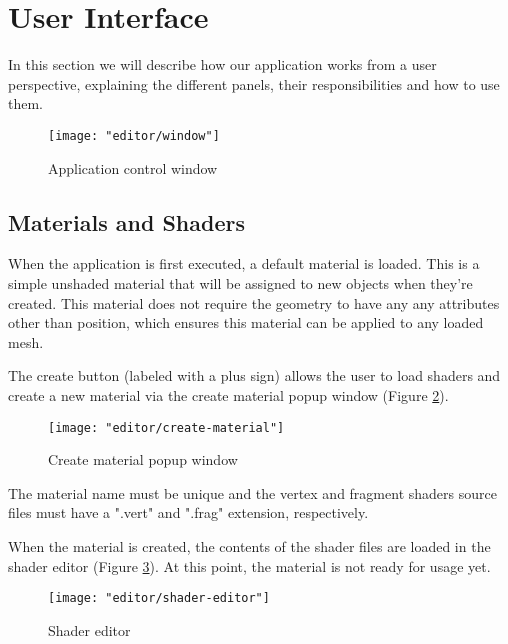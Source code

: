 \section{User Interface}
In this section we will describe how our application works from a user perspective, explaining the different panels, their responsibilities and how to use them.

\begin{figure}[ht]
    \caption{Application control window}
    \begin{center}
        \texttt{[image: "editor/window"]}
    \end{center}
    \label{fig:window}
\end{figure}


\subsection{Materials and Shaders}
When the application is first executed, a default material is loaded. This is a simple unshaded material that will be assigned to new objects when they're created. This material does not require the geometry to have any any attributes other than position, which ensures this material can be applied to any loaded mesh.

The create button (labeled with a plus sign) allows the user to load shaders and create a new material via the create material popup window (Figure \ref{fig:create-material}).

\begin{figure}[h]
    \caption{Create material popup window}
    \begin{center}
        \texttt{[image: "editor/create-material"]}
    \end{center}
    \label{fig:create-material}
\end{figure}

The material name must be unique and the vertex and fragment shaders source files must have a ".vert" and ".frag" extension, respectively.

When the material is created, the contents of the shader files are loaded in the shader editor (Figure \ref{fig:shader-editor}). At this point, the material is not ready for usage yet.

\begin{figure}
    \caption{Shader editor}
    \begin{center}
        \texttt{[image: "editor/shader-editor"]}
    \end{center}
    \label{fig:shader-editor}
\end{figure}

